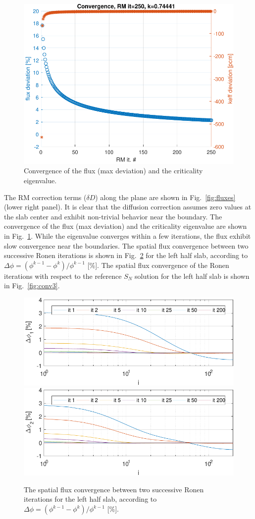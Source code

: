 
\begin{figure}[h!]
	\centering
	\includegraphics[width=0.4\linewidth]{convergence.pdf}
	\caption{Convergence of the flux (max deviation) and the criticality
		eigenvalue.}
	\label{fig:conv}
\end{figure}
The RM correction terms ($\delta D$) along the plane are shown in Fig.~\ref{fig:fluxes} (lower right panel). It is clear that the diffusion correction assumes zero values at the slab center and exhibit non-trivial behavior near the boundary. The convergence of the flux (max deviation) and the criticality eigenvalue are shown in Fig.~\ref{fig:conv}. While the eigenvalue converges within a few iterations, the flux exhibit slow convergence near the boundaries. The spatial flux convergence between two successive Ronen iterations is shown in Fig.~\ref{fig:conv2} for the left half slab, according to $\Delta\phi = (\phi^{k-1}-\phi^k)/\phi^{k-1}$ [\%]. The spatial flux convergence of the Ronen iterations with respect to the reference $S_N$ solution for the left half slab is shown in Fig.~\ref{fig:conv3}.

\begin{figure}[h!]
	\centering
	\includegraphics[width=0.45\linewidth]{flux_deviation_half_it_1.pdf}
	\includegraphics[width=0.45\linewidth]{flux_deviation_half_it_2.pdf}
	\caption{The spatial flux convergence between two successive Ronen iterations for the left half slab, according to $\Delta\phi = (\phi^{k-1}-\phi^k)/\phi^{k-1}$ [\%].}
	\label{fig:conv2}
\end{figure}

